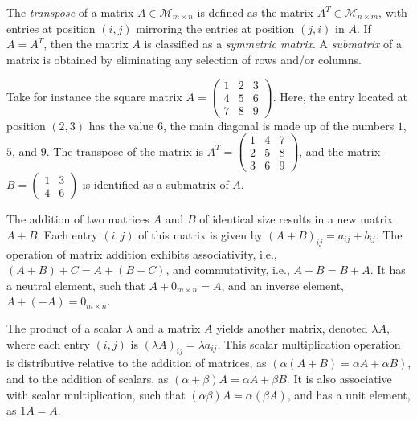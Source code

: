The \emph{transpose} of a matrix $A \in \mathcal{M}_{m \times n}$ is defined as the matrix $A^T \in \mathcal{M}_{n \times m}$, with entries at position $(i,j)$ mirroring the entries at position $(j, i)$ in $A$. If $A = A^T$, then the matrix $A$ is classified as a \emph{symmetric matrix}. A \emph{submatrix} of a matrix is obtained by eliminating any selection of rows and/or columns.

\begin{example}
Take for instance the square matrix $A = \left( \begin{smallmatrix} 1 & 2 & 3 \\ 4 & 5 & 6 \\ 7 & 8 & 9 \end{smallmatrix} \right)$. Here, the entry located at position $(2, 3)$ has the value $6$, the main diagonal is made up of the numbers $1$, $5$, and $9$. The transpose of the matrix is $A^T = \left( \begin{smallmatrix} 1 & 4 & 7 \\ 2 & 5 & 8 \\ 3 & 6 & 9 \end{smallmatrix} \right)$, and the matrix $B = \left( \begin{smallmatrix} 1 & 3 \\ 4 & 6 \end{smallmatrix} \right)$ is identified as a submatrix of $A$.
\end{example}

The addition of two matrices $A$ and $B$ of identical size results in a new matrix $A + B$. Each entry $(i, j)$ of this matrix is given by $(A + B)_{ij} = a_{ij} + b_{ij}$. The operation of matrix addition exhibits associativity, i.e., $(A + B) + C = A + (B + C)$, and commutativity, i.e., $A + B = B + A$. It has a neutral element, such that $A + 0_{m \times n} = A$, and an inverse element, $A + (-A) = 0_{m \times n}$.

The product of a scalar $\lambda$ and a matrix $A$ yields another matrix, denoted $\lambda A$, where each entry $(i, j)$ is $(\lambda A)_{ij} = \lambda a_{ij}$. This scalar multiplication operation is distributive relative to the addition of matrices, as $(\alpha (A + B) = \alpha A + \alpha B)$, and to the addition of scalars, as $(\alpha + \beta) A = \alpha A + \beta B$. It is also associative with scalar multiplication, such that $(\alpha \beta) A = \alpha (\beta A)$, and has a unit element, as $1 A = A$.

